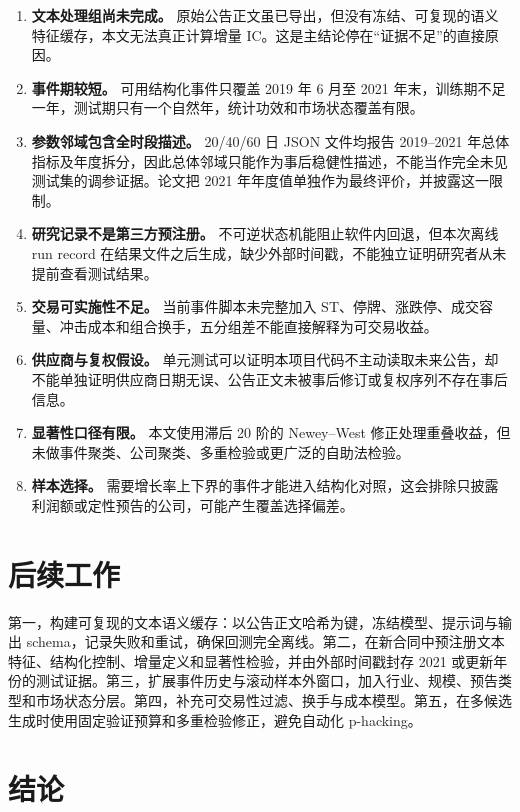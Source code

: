 \documentclass[UTF8,zihao=-4]{ctexart}
\theoremstyle{accentthm}
\begin{document}
\begin{enumerate}[leftmargin=2.2em,itemsep=3pt,topsep=2pt]
  \item \textbf{文本处理组尚未完成。} 原始公告正文虽已导出，但没有冻结、可复现的语义特征缓存，本文无法真正计算增量 IC。这是主结论停在“证据不足”的直接原因。
  \item \textbf{事件期较短。} 可用结构化事件只覆盖 2019 年 6 月至 2021 年末，训练期不足一年，测试期只有一个自然年，统计功效和市场状态覆盖有限。
  \item \textbf{参数邻域包含全时段描述。} 20/40/60 日 JSON 文件均报告 2019--2021 年总体指标及年度拆分，因此总体邻域只能作为事后稳健性描述，不能当作完全未见测试集的调参证据。论文把 2021 年年度值单独作为最终评价，并披露这一限制。
  \item \textbf{研究记录不是第三方预注册。} 不可逆状态机能阻止软件内回退，但本次离线 run record 在结果文件之后生成，缺少外部时间戳，不能独立证明研究者从未提前查看测试结果。
  \item \textbf{交易可实施性不足。} 当前事件脚本未完整加入 ST、停牌、涨跌停、成交容量、冲击成本和组合换手，五分组差不能直接解释为可交易收益。
  \item \textbf{供应商与复权假设。} 单元测试可以证明本项目代码不主动读取未来公告，却不能单独证明供应商日期无误、公告正文未被事后修订或复权序列不存在事后信息。
  \item \textbf{显著性口径有限。} 本文使用滞后 20 阶的 Newey--West 修正处理重叠收益，但未做事件聚类、公司聚类、多重检验或更广泛的自助法检验。
  \item \textbf{样本选择。} 需要增长率上下界的事件才能进入结构化对照，这会排除只披露利润额或定性预告的公司，可能产生覆盖选择偏差。
\end{enumerate}

\section{后续工作}

第一，构建可复现的文本语义缓存：以公告正文哈希为键，冻结模型、提示词与输出 schema，记录失败和重试，确保回测完全离线。第二，在新合同中预注册文本特征、结构化控制、增量定义和显著性检验，并由外部时间戳封存 2021 或更新年份的测试证据。第三，扩展事件历史与滚动样本外窗口，加入行业、规模、预告类型和市场状态分层。第四，补充可交易性过滤、换手与成本模型。第五，在多候选生成时使用固定验证预算和多重检验修正，避免自动化 p-hacking。

\section{结论}
\end{document}

